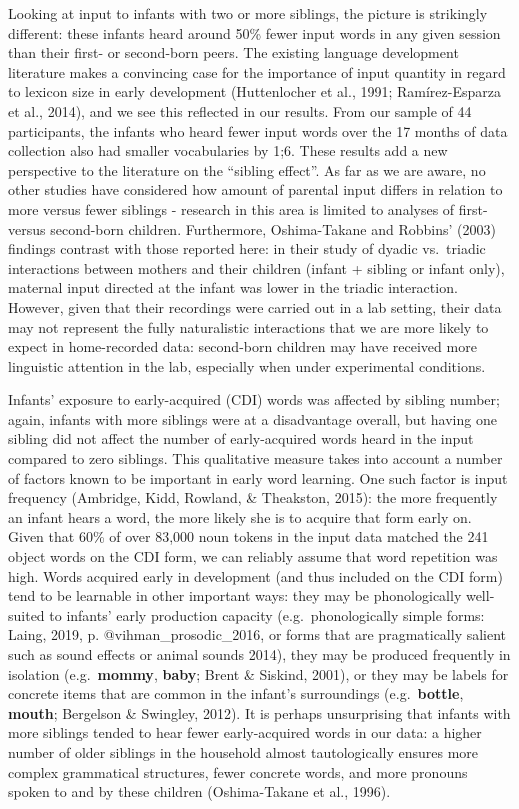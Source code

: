 \documentclass[
  english,
  man,floatsintext]{apa6}
\begin{document}
Looking at input to infants with two or more siblings, the picture is strikingly different: these infants heard around 50\% fewer input words in any given session than their first- or second-born peers. The existing language development literature makes a convincing case for the importance of input quantity in regard to lexicon size in early development (Huttenlocher et al., 1991; Ramírez-Esparza et al., 2014), and we see this reflected in our results. From our sample of 44 participants, the infants who heard fewer input words over the 17 months of data collection also had smaller vocabularies by 1;6. These results add a new perspective to the literature on the \enquote{sibling effect}. As far as we are aware, no other studies have considered how amount of parental input differs in relation to more versus fewer siblings - research in this area is limited to analyses of first- versus second-born children. Furthermore, Oshima-Takane and Robbins' (2003) findings contrast with those reported here: in their study of dyadic vs.~triadic interactions between mothers and their children (infant + sibling or infant only), maternal input directed at the infant was lower in the triadic interaction. However, given that their recordings were carried out in a lab setting, their data may not represent the fully naturalistic interactions that we are more likely to expect in home-recorded data: second-born children may have received more linguistic attention in the lab, especially when under experimental conditions.

Infants' exposure to early-acquired (CDI) words was affected by sibling number; again, infants with more siblings were at a disadvantage overall, but having one sibling did not affect the number of early-acquired words heard in the input compared to zero siblings. This qualitative measure takes into account a number of factors known to be important in early word learning. One such factor is input frequency (Ambridge, Kidd, Rowland, \& Theakston, 2015): the more frequently an infant hears a word, the more likely she is to acquire that form early on. Given that 60\% of over 83,000 noun tokens in the input data matched the 241 object words on the CDI form, we can reliably assume that word repetition was high. Words acquired early in development (and thus included on the CDI form) tend to be learnable in other important ways: they may be phonologically well-suited to infants' early production capacity (e.g.~phonologically simple forms: Laing, 2019, p. @vihman\_prosodic\_2016, or forms that are pragmatically salient such as sound effects or animal sounds 2014), they may be produced frequently in isolation (e.g.~\textbf{mommy}, \textbf{baby}; Brent \& Siskind, 2001), or they may be labels for concrete items that are common in the infant's surroundings (e.g.~\textbf{bottle}, \textbf{mouth}; Bergelson \& Swingley, 2012). It is perhaps unsurprising that infants with more siblings tended to hear fewer early-acquired words in our data: a higher number of older siblings in the household almost tautologically ensures more complex grammatical structures, fewer concrete words, and more pronouns spoken to and by these children (Oshima-Takane et al., 1996).
\end{document}
